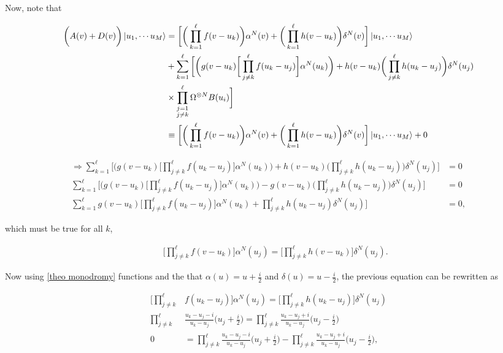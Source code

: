 \documentclass{homework}
\begin{document}
Now, note that 

\begin{align*}
        \bigg(A(v) + D(v) \bigg)\ket{u_1, \cdots u_M} &= \bigg[\bigg(\prod_{k=1}^{\ell} f(v-u_k)\bigg)\alpha^N(v) + \bigg(\prod_{k=1}^{\ell} h(v-u_k)\bigg) \delta^N(v) \bigg] \ket{u_1, \cdots u_M} \\
        &+ \sum_{k=1}^{\ell} \bigg[\bigg(g(v-u_k) \bigg[ \prod_{j \neq k}^{\ell} f(u_k - u_j)\bigg] \alpha^N(u_k)\bigg) + h(v-u_k) \bigg(\prod_{j \neq k}^{\ell} h(u_k - u_j)\bigg) \delta^N(u_j) \\
        &\times \prod_{\substack{j = 1 \\
                                 j \neq k}}^{\ell} \Omega^{\otimes N} B(u_i)\bigg]\\
    &\equiv \bigg[\bigg(\prod_{k=1}^{\ell} f(v-u_k)\bigg)\alpha^N(v) + \bigg(\prod_{k=1}^{\ell} h(v-u_k)\bigg) \delta^N(v) \bigg] \ket{u_1, \cdots u_M} + 0
\end{align*}

\begin{align*}
    \Rightarrow \sum_{k=1}^{\ell} \bigg[\bigg(g(v-u_k) \bigg[ \prod_{j \neq k}^{\ell} f(u_k - u_j)\bigg] \alpha^N(u_k)\bigg) + h(v-u_k) \bigg(\prod_{j \neq k}^{\ell} h(u_k - u_j)\bigg)  \delta^N(u_j) \bigg] &= 0 \\
    \sum_{k=1}^{\ell} \bigg[\bigg(g(v-u_k) \bigg[ \prod_{j \neq k}^{\ell} f(u_k - u_j)\bigg] \alpha^N(u_k)\bigg) - g(v-u_k) \bigg(\prod_{j \neq k}^{\ell} h(u_k - u_j)\bigg)  \delta^N(u_j) \bigg] &= 0 \\
    \sum_{k=1}^{\ell} g(v-u_k) \bigg[ \prod_{j \neq k}^{\ell} f(u_k - u_j)\bigg] \alpha^N(u_k) + \prod_{j \neq k}^{\ell} h(u_k - u_j) \delta^N(u_j) \bigg] &= 0,
\end{align*}

which must be true for all $k$,

\begin{align}
    & & \bigg[\prod_{j \neq k}^{\ell} f(v- u_k)\bigg] \alpha^N(u_j) = \bigg[\prod_{j \neq k}^{\ell} h(v - u_k) \bigg]  \delta^N(u_j).
\end{align}

Now using \cref{theo monodromy} functions and the that $\alpha(u) = u + \frac{i}{2}$ and $\delta(u) = u - \frac{i}{2}$, the previous equation can be rewritten as 

\begin{equation}
    \begin{split}
        \bigg[\prod_{j \neq k}^{\ell} &f(u_k - u_j)\bigg] \alpha^N(u_j) = \bigg[\prod_{j \neq k}^{\ell} h(u_k - u_j) \bigg]  \delta^N(u_j) \\
        \prod_{j \neq k}^{\ell} &\frac{u_k - u_j - i}{u_k - u_j} \bigg(u_j + \frac{i}{2}\bigg) = \prod_{j \neq k}^{\ell} \frac{u_k - u_j + i}{u_k - u_j} \bigg(u_j - \frac{i}{2}\bigg)\\
        0 &= \prod_{j \neq k}^{\ell} \frac{u_k - u_j - i}{u_k - u_j} \bigg(u_j + \frac{i}{2}\bigg) - \prod_{j \neq k}^{\ell} \frac{u_k - u_j + i}{u_k - u_j} \bigg(u_j - \frac{i}{2}\bigg),
    \end{split}
\end{equation}
\end{document}
